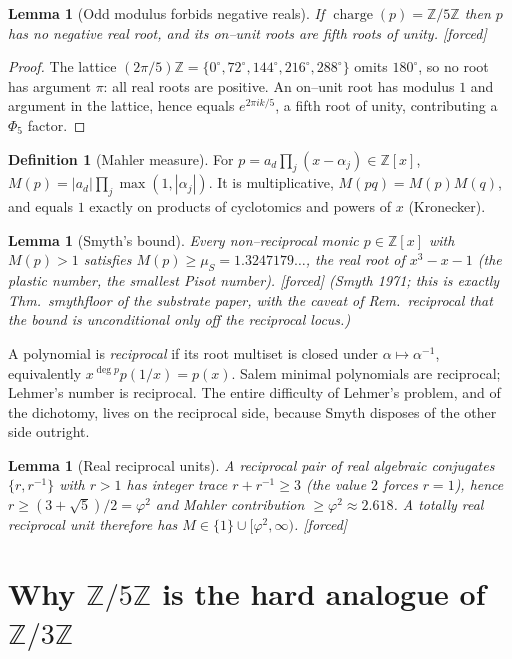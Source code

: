 \documentclass[11pt]{article}
\newcommand{\forced}{\textcolor{cforced}{\textsf{[forced]}}}
\newcommand{\Z}{\mathbb{Z}}
\newcommand{\Mah}{M}
\newcommand{\muS}{\mu_S}
\newcommand{\Zfive}{\Z/5\Z}
\DeclareMathOperator{\charge}{charge}
\theoremstyle{plain}
\newtheorem{lemma}[theorem]{Lemma}
\theoremstyle{definition}
\newtheorem{definition}[theorem]{Definition}
\theoremstyle{remark}
\begin{document}
\begin{lemma}[Odd modulus forbids negative reals]\label{lem:noneg}
If $\charge(p)=\Zfive$ then $p$ has no negative real root, and its on--unit roots are fifth roots of
unity. \forced{}
\end{lemma}
\begin{proof}
The lattice $(2\pi/5)\Z=\{0^\circ,72^\circ,144^\circ,216^\circ,288^\circ\}$ omits $180^\circ$, so no
root has argument $\pi$: all real roots are positive. An on--unit root has modulus $1$ and argument
in the lattice, hence equals $e^{2\pi ik/5}$, a fifth root of unity, contributing a $\Phi_5$ factor.
\end{proof}

\begin{definition}[Mahler measure]
For $p=a_d\prod_j(x-\alpha_j)\in\Z[x]$, $\Mah(p)=|a_d|\prod_j\max(1,|\alpha_j|)$. It is multiplicative,
$\Mah(pq)=\Mah(p)\Mah(q)$, and equals $1$ exactly on products of cyclotomics and powers of $x$
(Kronecker).
\end{definition}

\begin{lemma}[Smyth's bound]\label{lem:smyth}
Every non--reciprocal monic $p\in\Z[x]$ with $\Mah(p)>1$ satisfies $\Mah(p)\ge\muS=1.3247179\ldots$,
the real root of $x^3-x-1$ (the plastic number, the smallest Pisot number). \forced{} \emph{(Smyth
1971; this is exactly Thm.~\textup{smythfloor} of the substrate paper, with the caveat of
Rem.~\textup{reciprocal} that the bound is unconditional only off the reciprocal locus.)}
\end{lemma}

A polynomial is \emph{reciprocal} if its root multiset is closed under $\alpha\mapsto\alpha^{-1}$,
equivalently $x^{\deg p}p(1/x)=p(x)$. Salem minimal polynomials are reciprocal; Lehmer's number is
reciprocal. The entire difficulty of Lehmer's problem, and of the dichotomy, lives on the reciprocal
side, because Smyth disposes of the other side outright.

\begin{lemma}[Real reciprocal units]\label{lem:realrecip}
A reciprocal pair of real algebraic conjugates $\{r,r^{-1}\}$ with $r>1$ has integer trace
$r+r^{-1}\ge3$ (the value $2$ forces $r=1$), hence $r\ge(3+\sqrt5)/2=\varphi^2$ and Mahler
contribution $\ge\varphi^2\approx2.618$. A totally real reciprocal unit therefore has
$\Mah\in\{1\}\cup[\varphi^2,\infty)$. \forced{}
\end{lemma}

\section{Why $\Zfive$ is the hard analogue of $\Z/3\Z$}\label{sec:hard}
\end{document}
